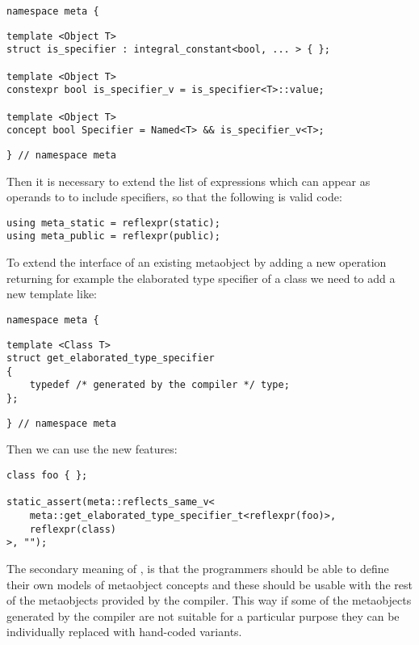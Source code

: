 \begin{verbatim}
namespace meta {
\end{verbatim}
\begin{verbatim}
template <Object T>
struct is_specifier : integral_constant<bool, ... > { };

template <Object T>
constexpr bool is_specifier_v = is_specifier<T>::value;

template <Object T>
concept bool Specifier = Named<T> && is_specifier_v<T>;

\end{verbatim}
\begin{verbatim}
} // namespace meta
\end{verbatim}

Then it is necessary to extend the list of expressions which can appear
as operands to \verb@reflexpr@ to include specifiers, so that the following
is valid code:

\begin{verbatim}
using meta_static = reflexpr(static);
using meta_public = reflexpr(public);
\end{verbatim}

To extend the interface of an existing metaobject by adding a new operation
returning for example the elaborated type specifier of a class we need to
add a new template like:

\begin{verbatim}
namespace meta {
\end{verbatim}
\begin{verbatim}
template <Class T>
struct get_elaborated_type_specifier
{
	typedef /* generated by the compiler */ type;
};
\end{verbatim}
\begin{verbatim}
} // namespace meta
\end{verbatim}

Then we can use the new features:

\begin{verbatim}
class foo { };

static_assert(meta::reflects_same_v<
	meta::get_elaborated_type_specifier_t<reflexpr(foo)>,
	reflexpr(class)
>, "");
\end{verbatim}

The secondary meaning of , is that
the programmers should be able to define their own models of metaobject concepts
and these should be usable with the rest of the metaobjects provided by the
compiler. This way if some of the metaobjects generated by the compiler are not
suitable for a particular purpose they can be individually replaced with
hand-coded variants.


